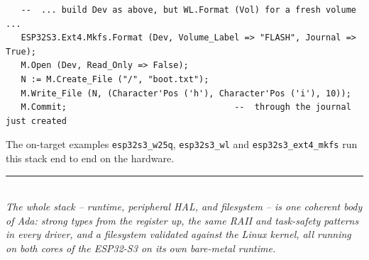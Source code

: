 \begin{lstlisting}
   --  ... build Dev as above, but WL.Format (Vol) for a fresh volume ...
   ESP32S3.Ext4.Mkfs.Format (Dev, Volume_Label => "FLASH", Journal => True);
   M.Open (Dev, Read_Only => False);
   N := M.Create_File ("/", "boot.txt");
   M.Write_File (N, (Character'Pos ('h'), Character'Pos ('i'), 10));
   M.Commit;                                 --  through the journal just created
\end{lstlisting}

\noindent The on-target examples \texttt{esp32s3\_w25q}, \texttt{esp32s3\_wl} and
\texttt{esp32s3\_ext4\_mkfs} run this stack end to end on the hardware.

\vfill
\noindent\rule{\linewidth}{0.4pt}\\[4pt]
\textit{The whole stack -- runtime, peripheral HAL, and filesystem -- is one
coherent body of Ada: strong types from the register up, the same RAII and
task-safety patterns in every driver, and a filesystem validated against the
Linux kernel, all running on both cores of the ESP32-S3 on its own bare-metal
runtime.}
